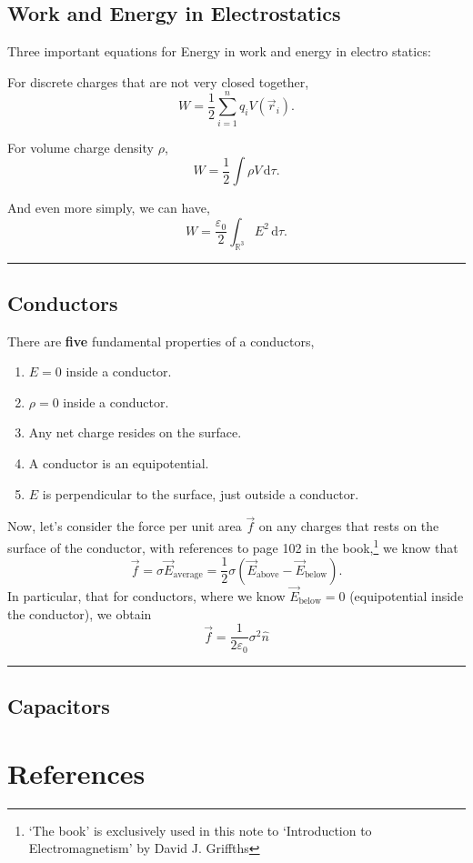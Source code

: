 \documentclass[a4paper]{article}
\newcommand{\dmr}[1]{\, \mathrm{d}#1} %
\numberwithin{equation}{subsection}
\begin{document}
\subsection{Work and Energy in Electrostatics}
Three important equations for Energy in work and energy in electro statics:
\par For discrete charges that are not very closed together,
\begin{equation}
    W = \frac{1}{2} \sum_{i = 1}^{n}q_i V(\vec{r}_i).
\end{equation}
\par For volume charge density $\rho$, 
\begin{equation}
    W = \frac12 \int \rho V \dmr{\tau}.
\end{equation}
\par And even more simply, we can have,
\begin{equation}
    W = \frac{\varepsilon_0}{2}\int_{\mathbb{R}^3}E^2\dmr{\tau}.
\end{equation}

\par\noindent\rule{\textwidth}{0.4pt}
\subsection{Conductors}
There are \textbf{five} fundamental properties of a conductors,
\begin{enumerate}
    \item $E = 0$ inside a conductor.
    \item $\rho = 0$ inside a conductor.
    \item Any net charge resides on the surface.
    \item A conductor is an equipotential.
    \item $E$ is perpendicular to the surface, just outside a conductor.
\end{enumerate}

Now, let's consider the force per unit area $\vec{f}$ on any charges that rests on the surface of the conductor, with references to page 102 in the book,\footnote{`The book' is exclusively used in this note to `Introduction to Electromagnetism' by David J. Griffths} we know that
\begin{equation}
    \vec{f} = \sigma \vec{E}_{\text{average}} = \frac12 \sigma (\vec{E}_{\text{above}}-\vec{E}_{\text{below}}).
\end{equation}
In particular, that for conductors, where we know $\vec{E}_{\text{below}} = 0$ (equipotential inside the conductor), we obtain 
\begin{equation}
    \vec{f} = \frac{1}{2\varepsilon_0}\sigma^2 \hat{n}
\end{equation} 
\par\noindent\rule{\textwidth}{0.4pt}

\subsection{Capacitors}





\newpage
\section*{References}
%
\printbibliography
[heading = none]
\end{document}
